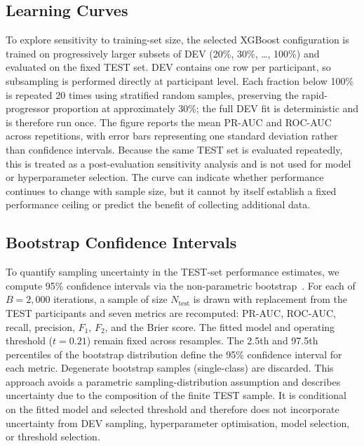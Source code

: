 \subsection{Learning Curves}
\label{subsec:methods_learning_curves}
To explore sensitivity to training-set size, the selected XGBoost configuration is trained on progressively larger subsets of DEV (20\%, 30\%, \ldots, 100\%) and evaluated on the fixed \gls{TEST} set.
DEV contains one row per participant, so subsampling is performed directly at participant level.
Each fraction below 100\% is repeated 20 times using stratified random samples, preserving the rapid-progressor proportion at approximately 30\%; the full DEV fit is deterministic and is therefore run once.
The figure reports the mean \gls{PR-AUC} and \gls{ROC-AUC} across repetitions, with error bars representing one standard deviation rather than confidence intervals.
Because the same TEST set is evaluated repeatedly, this is treated as a post-evaluation sensitivity analysis and is not used for model or hyperparameter selection.
The curve can indicate whether performance continues to change with sample size, but it cannot by itself establish a fixed performance ceiling or predict the benefit of collecting additional data.

\subsection{Bootstrap Confidence Intervals}
\label{subsec:methods_bootstrap}
To quantify sampling uncertainty in the \gls{TEST}-set performance estimates, we compute 95\% confidence intervals via the non-parametric bootstrap~\cite{efron1993bootstrap}.
For each of $B\!=\!2{,}000$ iterations, a sample of size $N_{\text{test}}$ is drawn with replacement from the \gls{TEST} participants and seven metrics are recomputed: \gls{PR-AUC}, \gls{ROC-AUC}, recall, precision, $F_1$, $F_2$, and the Brier score.
The fitted model and operating threshold ($t=0.21$) remain fixed across resamples.
The 2.5th and 97.5th percentiles of the bootstrap distribution define the 95\% confidence interval for each metric.
Degenerate bootstrap samples (single-class) are discarded.
This approach avoids a parametric sampling-distribution assumption and describes uncertainty due to the composition of the finite TEST sample.
It is conditional on the fitted model and selected threshold and therefore does not incorporate uncertainty from DEV sampling, hyperparameter optimisation, model selection, or threshold selection.

